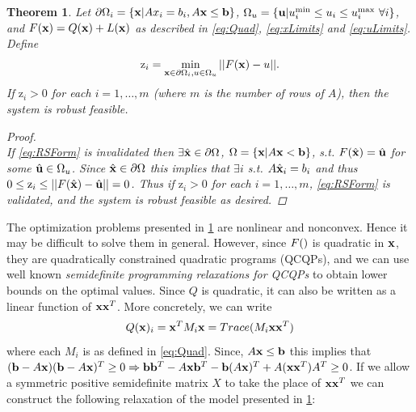 \documentclass[11pt]{article}
\theoremstyle{plain}
\newtheorem{thm}{Theorem}[section]
\theoremstyle{definition}
\theoremstyle{remark}
\begin{document}
\begin{thm} \label{thm:RobFeas}
Let $\partial\Omega_i=\{\bold x| Ax_i = b_i, A\bold x\leq \bold b\}$, $\Omega_{u}=\{\bold u| u^{\min}_i\leq u_i \leq u^{\max}_i \ \forall i \}$, and $F(\bold x)=Q(\bold x)+L(\bold x)$ as described in \eqref{eq:Quad}, \eqref{eq:xLimits} and \eqref{eq:uLimits}. Define
\begin{align}
\mathrm{z}_i =  \min_{\bold x\in\partial\Omega_i, u\in \Omega_u} ||F(\bold x)-u||. \label{eq:OPTfeas}
\end{align}
If $\mathrm{z}_i>0$ for each $i = 1, \ldots, m$ (where $m$ is the number of rows of $A$), then the system is robust feasible.

\begin{proof} \ \\
If \eqref{eq:RSForm} is invalidated then $\exists \hat{\bold x}\in\partial\Omega$, $\Omega=\{\bold x| A\bold x< \bold b\}$, s.t. $F(\hat{\bold x})=\hat{\bold u}$ for some $\hat{\bold u}\in \Omega_u$. 
Since $\hat{\bold x}\in\partial\Omega$ this implies that $\exists i$ s.t. $A\hat{\bold x}_i=b_i$ and thus $0\leq \mathrm{z}_i \leq ||F(\hat{\bold x})-\hat{\bold u}||=0$.
Thus if $\mathrm{z}_i>0$ for each $i = 1, \ldots, m$, \eqref{eq:RSForm} is validated, and the system is robust feasible as desired.
\end{proof}
\end{thm}



The optimization problems presented in \cref{thm:RobFeas} are nonlinear and nonconvex.
Hence it may be difficult to solve them in general.
However, since $F(\bold )$ is quadratic in $\bold x$, they are quadratically constrained quadratic programs (QCQPs), and we can use well known \emph{semidefinite programming relaxations for QCQPs} %
to obtain lower bounds on the optimal values.
Since $Q$ is quadratic, it can also be written as a linear function of $\bold x\bold x^T$.
More concretely, we can write
$$Q(\bold x)_i=\bold x^TM_i\bold x=Trace(M_i\bold x\bold x^T)$$
where each $M_i$ is as defined in \eqref{eq:Quad}. 
Since, $A\bold x\leq \bold b$ this implies that $(\bold b-A\bold x)(\bold b-A\bold x)^T\geq 0\Rightarrow \bold b\bold b^T-A\bold x\bold b^T-\bold b(A\bold x)^T+A(\bold x\bold x^T)A^T\geq 0$. 
If we allow a symmetric positive semidefinite matrix $X$ to take the place of $\bold x\bold x^T$ we can construct the following relaxation of the model presented in \cref{thm:RobFeas}:
 
\end{document}
